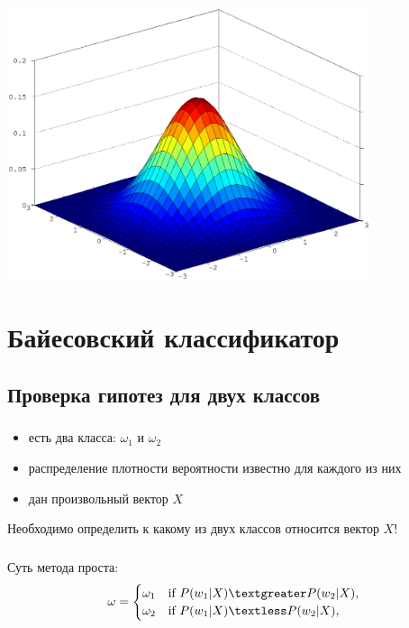 \documentclass{beamer}
\begin{document}
\begin{frame}
  \frametitle{\insertsection}
  \framesubtitle{\insertsubsection}
  \includegraphics[width=0.8\textwidth]{normal.eps}  
\end{frame}

\section{Байесовский классификатор}
\subsection{Проверка гипотез для двух классов}

\begin{frame}
  \frametitle{\insertsection}
  \framesubtitle{\insertsubsection}
  
  \begin{itemize}
    \item есть два класса: $\omega_1$ и $\omega_2$ \pause
    \item распределение плотности вероятности известно для каждого из них \pause
    \item дан произвольный вектор $X$
  \end{itemize}
  Необходимо определить к какому из двух классов относится вектор $X$!
  
\end{frame}

\begin{frame}
  \frametitle{\insertsection}
  \framesubtitle{\insertsubsection}
  Суть метода проста:
  \begin{equation*}
    \omega =
    \begin{cases}
      \omega_1 & \text{if } P(w_1 | X) \textgreater P(w_2 | X),\\
      \omega_2 & \text{if } P(w_1 | X) \textless P(w_2 | X),
    \end{cases}
  \end{equation*}
\end{frame}
\end{document}
